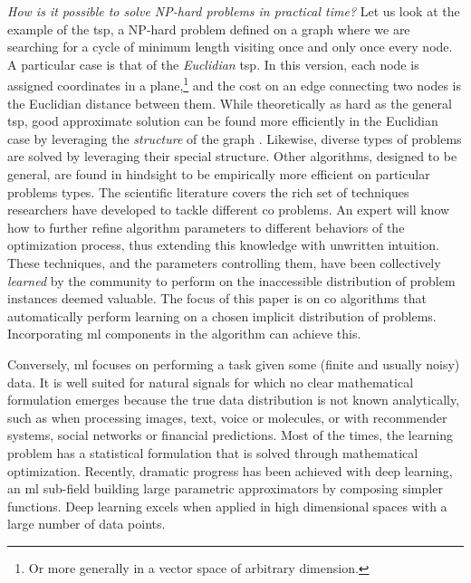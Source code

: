 \documentclass[11pt]{article}
\begin{document}
	\emph{How is it possible to solve NP-hard problems in practical time?}
	Let us look at the example of the \gls{tsp}, a NP-hard problem defined on a graph where we are
	searching for a cycle of minimum length visiting once and only once every node.
	A particular case is that of the \emph{Euclidian} \gls{tsp}.
    In this version, each node is assigned coordinates in a plane,\footnote{
        Or more generally in a vector space of arbitrary dimension.
    } and the cost on an edge connecting two nodes is the Euclidian distance between them.
    While theoretically as hard as the general \gls{tsp}, good approximate solution can be found
    more efficiently in the Euclidian case by leveraging the \emph{structure} of the graph
    \citep[Chapter 6.4.7]{LarsonUrban1981}.
    Likewise, diverse types of problems are solved by leveraging their special structure.
    Other algorithms, designed to be general, are found in hindsight to be empirically more
    efficient on particular problems types.
	The scientific literature covers the rich set of techniques researchers have developed
	to tackle different \gls{co} problems.
	An expert will know how to further refine algorithm parameters to different behaviors
	of the optimization process, thus extending this knowledge with unwritten intuition.
	These techniques, and the parameters controlling them, have been collectively
	\emph{learned} by the community to perform on the inaccessible distribution of problem
	instances deemed valuable.
	The focus of this paper is on \gls{co} algorithms that automatically perform
	learning on a chosen implicit distribution of problems.
	Incorporating \gls{ml} components in the algorithm can achieve this.

	Conversely, \gls{ml} focuses on performing a task given some (finite and usually noisy) data.
	It is well suited for natural signals for which no clear mathematical formulation emerges because
	the true data distribution is not known analytically, such as when processing images, text, voice
	or molecules, or with recommender systems, social networks or financial predictions.
	Most of the times, the learning problem has a statistical formulation that is solved through
	mathematical optimization.
	Recently, dramatic progress has been achieved with deep learning, an \gls{ml} sub-field building
	large parametric approximators by composing simpler functions.
	Deep learning excels when applied in high dimensional spaces with a large number of data points.
\end{document}
